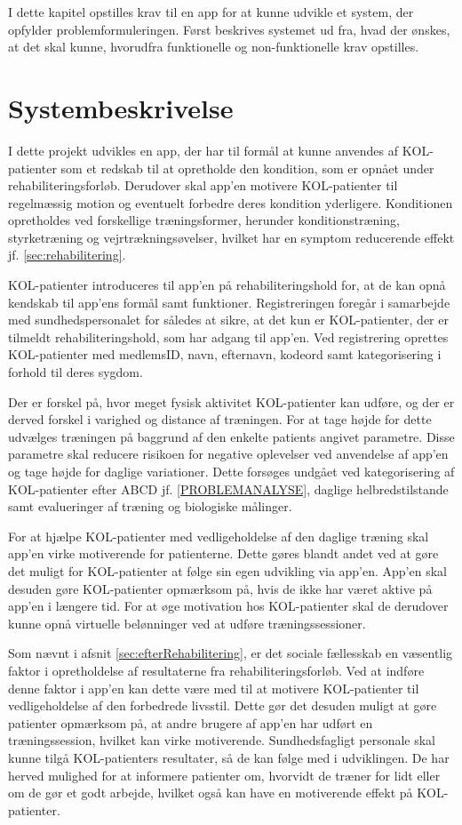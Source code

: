 I dette kapitel opstilles krav til en app for at kunne udvikle et system, der opfylder problemformuleringen. Først beskrives systemet ud fra, hvad der ønskes, at det skal kunne, hvorudfra funktionelle og non-funktionelle krav opstilles.

\section{Systembeskrivelse} \label{sec:systembeskrivelse}
I dette projekt udvikles en app, der har til formål at kunne anvendes af KOL-patienter som et redskab til at opretholde den kondition, som er opnået under rehabiliteringsforløb. Derudover skal app’en motivere KOL-patienter til regelmæssig motion og eventuelt forbedre deres kondition yderligere. Konditionen opretholdes ved forskellige træningsformer, herunder konditionstræning, styrketræning og vejrtrækningsøvelser, hvilket har en symptom reducerende effekt jf. \autoref{sec:rehabilitering}. 

KOL-patienter introduceres til app’en på rehabiliteringshold for, at de kan opnå kendskab til app’ens formål samt funktioner. Registreringen foregår i samarbejde med sundhedspersonalet for således at sikre, at det kun er KOL-patienter, der er tilmeldt rehabiliteringshold, som har adgang til app’en. Ved registrering oprettes KOL-patienter med medlemsID, navn, efternavn, kodeord samt kategorisering i forhold til deres sygdom. 

Der er forskel på, hvor meget fysisk aktivitet KOL-patienter kan udføre, og der er derved forskel i varighed og distance af træningen. For at tage højde for dette udvælges træningen på baggrund af den enkelte patients angivet parametre. Disse parametre skal reducere risikoen for negative oplevelser ved anvendelse af app’en og tage højde for daglige variationer. Dette forsøges undgået ved kategorisering af KOL-patienter efter ABCD jf. \autoref{PROBLEMANALYSE}, daglige helbredstilstande samt evalueringer af træning og biologiske målinger.  

For at hjælpe KOL-patienter med vedligeholdelse af den daglige træning skal app’en virke motiverende for patienterne. Dette gøres blandt andet ved at gøre det muligt for KOL-patienter at følge sin egen udvikling via app’en. App’en skal desuden gøre KOL-patienter opmærksom på, hvis de ikke har været aktive på app'en i længere tid. For at øge motivation hos KOL-patienter skal de derudover kunne opnå virtuelle belønninger ved at udføre træningssessioner.

Som nævnt i afsnit \ref{sec:efterRehabilitering}, er det sociale fællesskab en væsentlig faktor i opretholdelse af resultaterne fra rehabiliteringsforløb. Ved at indføre denne faktor i app’en kan dette være med til at motivere KOL-patienter til vedligeholdelse af den forbedrede livsstil. Dette gør det desuden muligt at gøre patienter opmærksom på, at andre brugere af app’en har udført en træningssession, hvilket kan virke motiverende.
Sundhedsfagligt personale skal kunne tilgå KOL-patienters resultater, så de kan følge med i udviklingen. De har herved mulighed for at informere patienter om, hvorvidt de træner for lidt eller om de gør et godt arbejde, hvilket også kan have en motiverende effekt på KOL-patienter.


